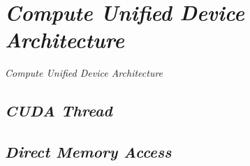 

\section{\emph{Compute Unified Device Architecture}}

  \emph{Compute Unified Device Architecture} 

  \subsection{\emph{CUDA Thread}}

  \subsection{\emph{Direct Memory Access}}








